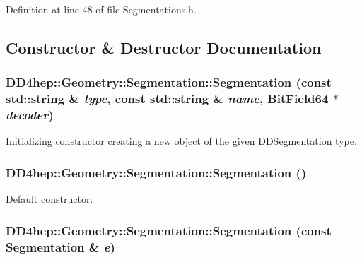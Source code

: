 Definition at line 48 of file Segmentations.h.

\subsection{Constructor \& Destructor Documentation}
\hypertarget{class_d_d4hep_1_1_geometry_1_1_segmentation_aefd1b9d678af0f0863c7d83d8f0e2534}{
\subsubsection[{Segmentation}]{\setlength{\rightskip}{0pt plus 5cm}DD4hep::Geometry::Segmentation::Segmentation (const std::string \& {\em type}, \/  const std::string \& {\em name}, \/  BitField64 $\ast$ {\em decoder})}}
\label{class_d_d4hep_1_1_geometry_1_1_segmentation_aefd1b9d678af0f0863c7d83d8f0e2534}


Initializing constructor creating a new object of the given \hyperlink{namespace_d_d4hep_1_1_d_d_segmentation}{DDSegmentation} type. \hypertarget{class_d_d4hep_1_1_geometry_1_1_segmentation_aedf30e71b234a1d29a3084b1a4910165}{
\subsubsection[{Segmentation}]{\setlength{\rightskip}{0pt plus 5cm}DD4hep::Geometry::Segmentation::Segmentation ()}}
\label{class_d_d4hep_1_1_geometry_1_1_segmentation_aedf30e71b234a1d29a3084b1a4910165}


Default constructor. \hypertarget{class_d_d4hep_1_1_geometry_1_1_segmentation_a0d8474b604d7eb4ca635007f9e46cbc2}{
\subsubsection[{Segmentation}]{\setlength{\rightskip}{0pt plus 5cm}DD4hep::Geometry::Segmentation::Segmentation (const {\bf Segmentation} \& {\em e})}}
\label{class_d_d4hep_1_1_geometry_1_1_segmentation_a0d8474b604d7eb4ca635007f9e46cbc2}



